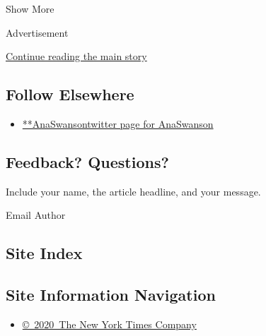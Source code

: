 Show More

Advertisement

\protect\hyperlink{after-mid2}{Continue reading the main story}

\hypertarget{follow-elsewhere}{%
\subsection{Follow Elsewhere}\label{follow-elsewhere}}

\begin{itemize}
\tightlist
\item
  \href{https://twitter.com/AnaSwanson}{**AnaSwansontwitter page for
  AnaSwanson}
\end{itemize}

\hypertarget{feedback-questions}{%
\subsection{Feedback? Questions?}\label{feedback-questions}}

Include your name, the article headline, and your message.

Email Author

\hypertarget{site-index}{%
\subsection{Site Index}\label{site-index}}

\hypertarget{site-information-navigation}{%
\subsection{Site Information
Navigation}\label{site-information-navigation}}

\begin{itemize}
\tightlist
\item
  \href{https://help.nytimes3xbfgragh.onion/hc/en-us/articles/115014792127-Copyright-notice}{©~2020~The
  New York Times Company}
\end{itemize}


